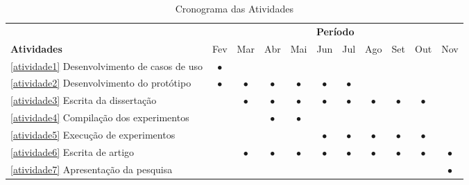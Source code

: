 \begin{table}[ht]
\small
\centering

\begin{tabular}{|l|c|c|c|c|c|c|c|c|c|c|}
\hline & \multicolumn{10}{|c|}{\textbf{Período}} \\ \cline{2-11}
\textbf{Atividades}                     &Fev     &Mar      &Abr     &Mai     &Jun      &Jul      &Ago      &Set     &Out     &Nov      
\\ \hline

\ref{atividade1} Desenvolvimento de casos de uso  &$\bullet$& &        &         &         &         &     &        &       &     
\\ \hline

\ref{atividade2} Desenvolvimento do protótipo    &$\bullet$ &$\bullet$&$\bullet$&$\bullet$&$\bullet$&$\bullet$&       &       &      &
\\ \hline

\ref{atividade3} Escrita da dissertação                &         &$\bullet$ &$\bullet$ &$\bullet$&$\bullet$&$\bullet$&$\bullet$&$\bullet$&$\bullet$&
\\ \hline

\ref{atividade4} Compilação dos experimentos    &         &         &$\bullet$&$\bullet$&     &      &     &   &   &
\\ \hline

\ref{atividade5} Execução de experimentos               &      &      &      &       &$\bullet$&$\bullet$&$\bullet$&$\bullet$&$\bullet$&
\\ \hline

\ref{atividade6} Escrita de artigo             &     &$\bullet$ &$\bullet$&$\bullet$&$\bullet$&$\bullet$&$\bullet$&$\bullet$&$\bullet$&$\bullet$
\\ \hline

\ref{atividade7} Apresentação da pesquisa &         &         &         &         &         &         &    &    &     &$\bullet$
\\ \hline

\end{tabular}

\caption{Cronograma das Atividades}\label{tabela:cronograma}
\end{table}

